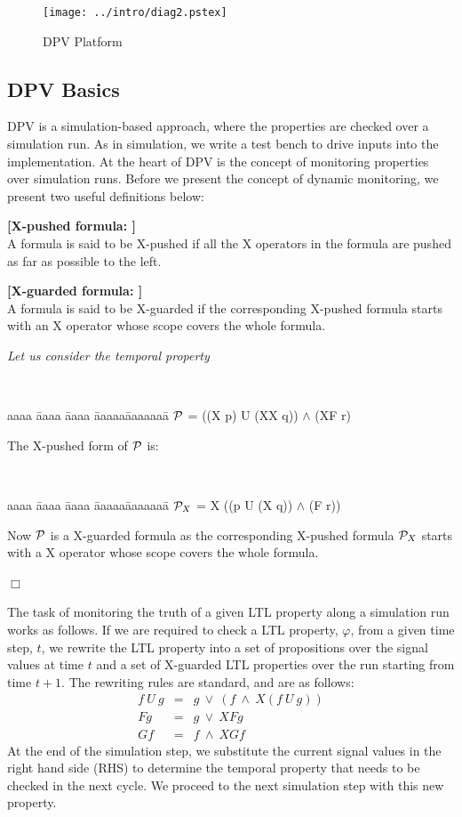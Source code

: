 \begin{figure}[htb]
\centering
\texttt{[image: ../intro/diag2.pstex]}
\center
\caption{DPV Platform} \label{fig2.11}
\end{figure}

\subsection{DPV Basics}
DPV is a simulation-based approach, where the properties are checked over 
a simulation run.  As in simulation, we write a test bench to drive inputs 
into the implementation. 
At the heart of DPV is the concept of monitoring properties over 
simulation runs. Before we present the concept of dynamic monitoring, 
we present two useful definitions below:

\begin{definition} {\bf [X-pushed formula: ]}\\
A formula is said to be X-pushed if all the X operators in the formula are
pushed as far as possible to the left.
\end{definition}

\begin{definition} {\bf [X-guarded formula: ]}\\
A formula is said to be X-guarded if the corresponding X-pushed formula
starts with an X operator whose scope covers the whole formula.
\end{definition}

\begin{example}
{\em
Let us consider the temporal property
{\tt
\begin{tabbing}
aaaa \= aaaa \= aaaa \= aaaaa\= aaaaaaa\= \kill
\>\>\>\>\> ${\cal P}$ = ((X p) U (XX q)) $\land$ (XF r)
\end{tabbing}
}
\noindent
The X-pushed form of $\cal P$ is:
{\tt
\begin{tabbing}
aaaa \= aaaa \= aaaa \= aaaaa\= aaaaaaa\= \kill
\>\>\>\>\> ${\cal P}_X$ = X ((p U (X q)) $\land$ (F r))
\end{tabbing}
}
\noindent
Now ${\cal P}$ is a X-guarded formula as the corresponding X-pushed
formula  ${\cal P}_{X}$ starts with a X operator whose scope covers the
 whole formula.
}$\Box$
\end{example}

\noindent
The task of monitoring the truth of a given LTL property along a simulation
run works as follows. If we are required to check a LTL property, $\varphi$,
from a given time step, $t$, we rewrite the LTL property into a set of
propositions over the signal values at time $t$ and a set of X-guarded LTL
properties over the run starting from time $t+1$. The rewriting rules are
standard, and are as follows:
\begin{eqnarray*}
f\ U\ g & = & g\ \lor\ (f\ \land\ X(f\ U\ g)) \\
Fg & = & g\ \lor\ XFg \\
Gf & = & f\ \land\ XGf
\end{eqnarray*}
\noindent
At the end of the simulation
step, we substitute the current signal values in the right hand side (RHS)
to determine the temporal property that needs to be checked in the next cycle.
We proceed to the next simulation step with this new property.


